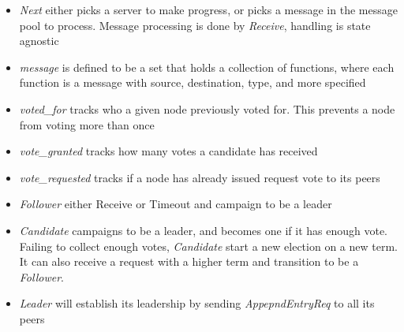 \documentclass{report}
\begin{document}
\begin{tlatex}
\@pvspace{8.0pt}%
%
%
%
%
%
\@pvspace{8.0pt}%
%
%
%
%
%
%
\end{tlatex}

\begin{itemize}
    \item \textit{Next} either picks a server to make progress, or picks a
    message in the message pool to process. Message processing is done by
    \textit{Receive}, handling is state agnostic
    \item \textit{message} is defined to be a set that holds a collection of functions, where 
    each function is a message with source, destination, type, and more specified
    \item \textit{voted\_for} tracks who a given node previously voted for.
    This prevents a node from voting more than once
    \item \textit{vote\_granted} tracks how many votes a candidate has received
    \item \textit{vote\_requested} tracks if a node has already issued request
    vote to its peers
    \item \textit{Follower} either Receive or Timeout and campaign to be a leader
    \item \textit{Candidate} campaigns to be a leader, and becomes one if it has
    enough vote. Failing to collect enough votes, \textit{Candidate} start a new
    election on a new term. It can also receive a request with a higher term and
    transition to be a \textit{Follower}.
    \item \textit{Leader} will establish its leadership by sending
    \textit{AppepndEntryReq} to all its peers
\end{itemize}
\end{document}

